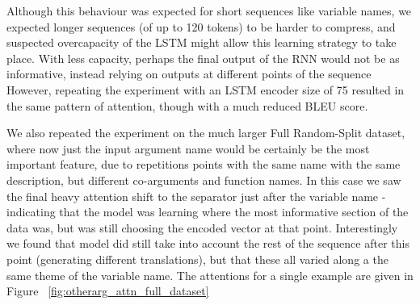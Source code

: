 Although this behaviour was expected for short sequences like variable names, we expected longer sequences (of up to 120 tokens) to be harder to compress, and suspected overcapacity of the LSTM might allow this learning strategy to take place. 
With less capacity, perhaps the final output of the RNN would not be as informative, instead relying on outputs at different points of the sequence
However, repeating the experiment with an LSTM encoder size of 75 resulted in the same pattern of attention, though with a much reduced BLEU score.

We also repeated the experiment on the much larger Full Random-Split dataset, where now just the input argument name would be certainly be the most important feature, due to repetitions points with the same name with the same description, but different co-arguments and function names. 
In this case we saw the final heavy attention shift to the separator just after the variable name - indicating that the model was learning where the most informative section of the data was, but was still choosing the encoded vector at that point. 
Interestingly we found that model did still take into account the rest of the sequence after this point (generating different translations), but that these all varied along a the same theme of the variable name. 
The attentions for a single example are given in Figure ~\ref{fig:otherarg_attn_full_dataset}

